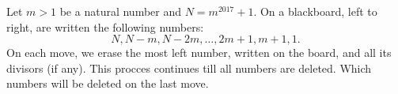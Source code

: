 Let $m>1$ be a natural number and $N=m^{2017}+1$. On a blackboard, left to right, are written the following numbers:
\[N, N-m, N-2m,\dots, 2m+1,m+1, 1.\]On each move, we erase the most left number, written on the board, and all its divisors (if any). This procces continues till all numbers are deleted.
Which numbers will be deleted on the last move.
